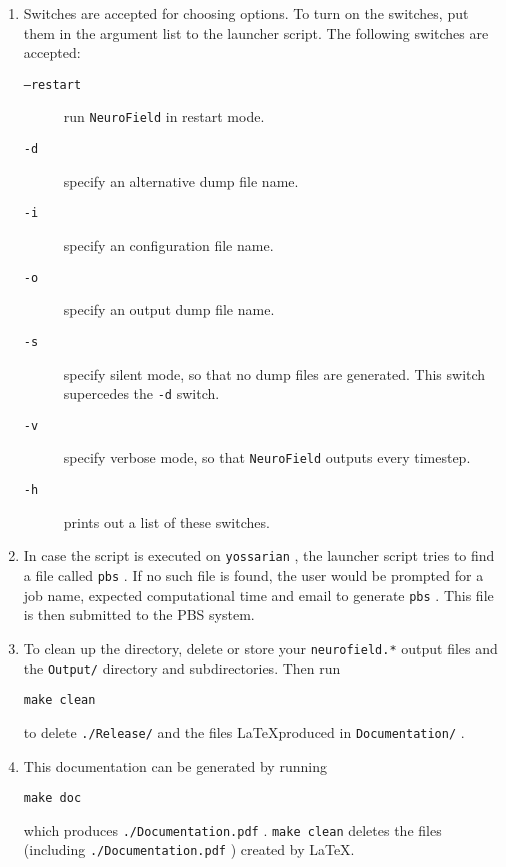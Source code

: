 \documentclass[12pt,a4paper]{article}
\newcommand{\type}[1]{ {\small\small\tt #1} }
\begin{document}
\begin{enumerate}
\item Switches are accepted for choosing options. To turn on the switches, put them in the argument list to the launcher script. The following switches are accepted:
	\begin{description}
	\item[\type{--restart}] run \type{NeuroField} in restart mode.
	\item[\type{-d}] specify an alternative dump file name.
	\item[\type{-i}] specify an configuration file name.
	\item[\type{-o}] specify an output dump file name.
	\item[\type{-s}] specify silent mode, so that no dump files are generated. This switch supercedes the \type{-d} switch.
	\item[\type{-v}] specify verbose mode, so that \type{NeuroField} outputs every timestep.
	\item[\type{-h}] prints out a list of these switches.
	\end{description}

\item In case the script is executed on \type{yossarian}, the launcher script tries to find a file called \type{pbs}. If no such file is found, the user would be prompted for a job name, expected computational time and email to generate \type{pbs}. This file is then submitted to the PBS system.

\item To clean up the directory, delete or store your \type{neurofield.*} output files and the \type{Output/} directory and subdirectories. Then run
\begin{lstlisting}
make clean
\end{lstlisting}
to delete \type{./Release/} and the files \LaTeX produced in \type{Documentation/}.

\item This documentation can be generated by running 
\begin{lstlisting}
make doc
\end{lstlisting}
which produces \type{./Document\-ation.pdf}. \type{make clean} deletes the files (including \type{./Document\-ation.pdf}) created by \LaTeX.

\end{enumerate}

\end{document}
